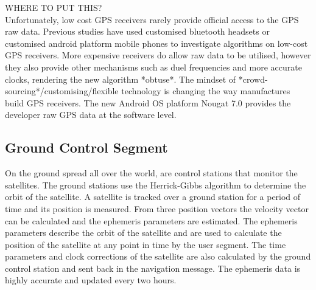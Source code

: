 WHERE TO PUT THIS?\\
Unfortunately, low cost GPS receivers rarely provide official access to the GPS raw data. Previous studies have used customised bluetooth headsets or customised android platform mobile phones to investigate algorithms on low-cost GPS receivers. More expensive receivers do allow raw data to be utilised, however they also provide other mechanisms such as duel frequencies and more accurate clocks, rendering the new algorithm *obtuse*. The mindset of *crowd-sourcing*/customising/flexible technology is changing the way manufactures build GPS receivers. The new Android OS platform Nougat 7.0 provides the developer raw GPS data at the software level.  

\subsection{Ground Control Segment}
On the ground spread all over the world, are control stations that monitor the satellites. The ground stations use the Herrick-Gibbs algorithm to determine the orbit of the satellite. A satellite is tracked over a ground station for a period of time and its position is measured. From three position vectors the velocity vector can be calculated and the ephemeris parameters are estimated. The ephemeris parameters describe the orbit of the satellite and are used to calculate the position of the satellite at any point in time by the user segment. The time parameters and clock corrections of the satellite are also calculated by the ground control station and sent back in the navigation message. The ephemeris data is highly accurate and updated every two hours.




